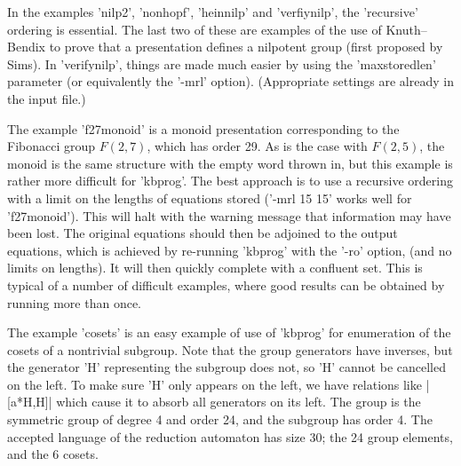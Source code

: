 In the examples 'nilp2', 'nonhopf', 'heinnilp' and 'verfiynilp', the
'recursive' ordering is essential. The last two of these are examples of
the use of Knuth--Bendix to prove that a presentation defines a nilpotent
group (first proposed by Sims). In 'verifynilp', things are made much
easier by using the 'maxstoredlen' parameter (or equivalently the '-mrl'
option). (Appropriate settings are already in the input file.)

The example 'f27monoid' is a monoid presentation
corresponding to the Fibonacci group $F(2,7)$, which has order 29.  As is
the case with $F(2,5)$, the monoid is the same structure with the empty
word thrown in, but this example is rather more difficult for 'kbprog'.
The best approach is to use a recursive ordering with a limit on the
lengths of equations stored ('-mrl 15 15' works well for 'f27monoid').
This will halt with the warning message that information may have been lost.
The original equations should then be adjoined to the output equations,
which is achieved by re-running 'kbprog' with the '-ro' option,
(and no limits on lengths).
It will then quickly complete with a confluent set. This is typical of a
number of difficult examples, where good results can be obtained by running
more than once.

The example 'cosets' is an easy example of use of 'kbprog' for enumeration
of the cosets of a nontrivial subgroup.
Note that the group generators have inverses, but the generator
'H' representing the subgroup does not, so 'H' cannot be
cancelled on the left. To make sure 'H' only appears on the left,
we have relations  like |[a*H,H]| which cause it to absorb all generators
on its left. The group is the symmetric group of
degree 4 and order 24, and the subgroup has order 4. The accepted language
of the reduction automaton has size 30; the 24 group elements, and the 6
cosets.
